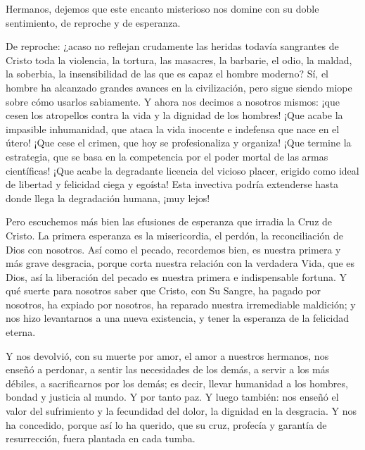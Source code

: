 			\begin{body}Hermanos, dejemos que este encanto misterioso nos domine con su doble sentimiento, de reproche y de esperanza. \end{body}
			
			\begin{body}De reproche: ¿acaso no reflejan crudamente las heridas todavía sangrantes de Cristo toda la violencia, la tortura, las masacres, la barbarie, el odio, la maldad, la soberbia, la insensibilidad de las que es capaz el hombre moderno? Sí, el hombre ha alcanzado grandes avances en la civilización, pero sigue siendo miope sobre cómo usarlos sabiamente. Y ahora nos decimos a nosotros mismos: ¡que cesen los atropellos contra la vida y la dignidad de los hombres! ¡Que acabe la impasible inhumanidad, que ataca la vida inocente e indefensa que nace en el útero! ¡Que cese el crimen, que hoy se profesionaliza y organiza! ¡Que termine la estrategia, que se basa en la competencia por el poder mortal de las armas científicas! ¡Que acabe la degradante licencia del vicioso placer, erigido como ideal de libertad y felicidad ciega y egoísta! Esta invectiva podría extenderse hasta donde llega la degradación humana, ¡muy lejos! \end{body}
			
			\begin{body}Pero escuchemos más bien las efusiones de esperanza que irradia la Cruz de Cristo. La primera esperanza es la misericordia, el perdón, la reconciliación de Dios con nosotros. Así como el pecado, recordemos bien, es nuestra primera y más grave desgracia, porque corta nuestra relación con la verdadera Vida, que es Dios, así la liberación del pecado es nuestra primera e indispensable fortuna. Y qué suerte para nosotros saber que Cristo, con Su Sangre, ha pagado por nosotros, ha expiado por nosotros, ha reparado nuestra irremediable maldición; y nos hizo levantarnos a una nueva existencia, y tener la esperanza de la felicidad eterna.\end{body}
			
			\begin{body}Y nos devolvió, con su muerte por amor, el amor a nuestros hermanos, nos enseñó a perdonar, a sentir las necesidades de los demás, a servir a los más débiles, a sacrificarnos por los demás; es decir, llevar humanidad a los hombres, bondad y justicia al mundo. Y por tanto paz. Y luego también: nos enseñó el valor del sufrimiento y la fecundidad del dolor, la dignidad en la desgracia. Y nos ha concedido, porque así lo ha querido, que su cruz, profecía y garantía de resurrección, fuera plantada en cada tumba. \end{body}
			
